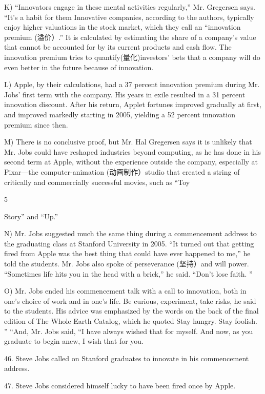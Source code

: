 \documentclass[UTF8,11pt]{ctexart}
\begin{document}
K) “Innovators engage in these mental activities regularly,” Mr. Gregersen says. “It’s a habit for them Innovative companies, according to the authors, typically enjoy higher valuations in the stock market, which they call an “innovation premium (溢价）.” It is calculated by estimating the share of a company’s value that cannot be accounted for by its current products and cash flow. The innovation premium tries to quantify(量化)investors’ bets that a company will do even better in the future because of innovation.


L) Apple, by their calculations, had a 37 percent innovation premium during Mr. Jobs’ first term with the company. His years in exile resulted in a 31 percent innovation discount. After his return, Applet fortunes improved gradually at first, and improved markedly starting in 2005, yielding a 52 percent innovation premium since then.


M) There is no conclusive proof, but Mr. Hal Gregersen says it is unlikely that Mr. Jobs could have reshaped industries beyond computing, as he has done in his second term at Apple, without the experience outside the company, especially at Pixar—the computer-animation (动画制作）studio that created a string of critically and commercially successful movies, such as “Toy


5


Story” and “Up.”


N) Mr. Jobs suggested much the same thing during a commencement address to the graduating class at Stanford University in 2005. “It turned out that getting fired from Apple was the best thing that could have ever happened to me,” he told the students. Mr. Jobs also spoke of perseverance (坚持）and will power. “Sometimes life hits you in the head with a brick,” he said. “Don’t lose faith. ”


O) Mr. Jobs ended his commencement talk with a call to innovation, both in one’s choice of work and in one’s life. Be curious, experiment, take risks, he said to the students. His advice was emphasized by the words on the back of the final edition of The Whole Earth Catalog, which he quoted Stay hungry. Stay foolish. ” “And, Mr. Jobs said, “I have always wished that for myself. And now, as you graduate to begin anew, I wish that for you.


46. Steve Jobs called on Stanford graduates to innovate in his commencement address.


47. Steve Jobs considered himself lucky to have been fired once by Apple.
\end{document}
